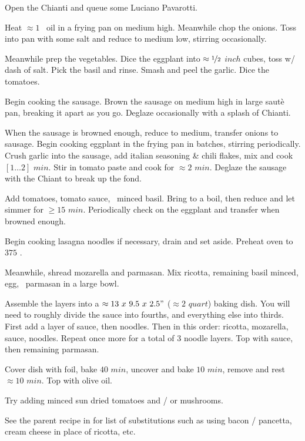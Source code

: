 
\begin{preparation}
\item Open the Chianti and queue some Luciano Pavarotti.
\item Heat $\approx 1$ \Tablespoon~oil in a frying pan on medium high.
	Meanwhile chop the onions.
	Toss into pan with some salt and reduce to medium low, stirring occasionally.
\item Meanwhile prep the vegetables.
	Dice the eggplant into $\approx\nicefrac{1}{2}$ $inch$ cubes, toss w/ dash of salt.
	Pick the basil and rinse.
	Smash and peel the garlic.
	Dice the tomatoes.
\item Begin cooking the sausage.
	Brown the sausage on medium high in large saut\`{e} pan, breaking it apart as you go.
	Deglaze occasionally with a splash of Chianti.
\item When the sausage is browned enough, reduce to medium, transfer onions to sausage.
	Begin cooking eggplant in the frying pan in batches, stirring periodically.
	Crush garlic into the sausage, add italian seasoning \& chili flakes, mix and cook $[1 \dots 2]$ $min$.
	Stir in tomato paste and cook for $\approx 2$ $min$.
	Deglaze the sausage with the Chiant to break up the fond.
\item Add tomatoes, tomato sauce, \onehalf~minced basil.
	Bring to a boil, then reduce and let simmer for $\geq 15$ $min$.
	Periodically check on the eggplant and transfer when browned enough.
\item Begin cooking lasagna noodles if necessary, drain and set aside.
	Preheat oven to $375$ \Fahrenheit.
\item Meanwhile, shread mozarella and parmasan.
	Mix ricotta, remaining basil minced, egg, \onehalf~parmasan in a large bowl.
\item Assemble the layers into a $\approx 13~x~9.5~x~2.5"$ ($\approx 2$ $quart$) baking dish.
	You will need to roughly divide the sauce into fourths, and everything else into thirds.
	First add a layer of sauce, then noodles.
	Then in this order: ricotta, mozarella, sauce, noodles.
	Repeat once more for a total of 3 noodle layers.
	Top with sauce, then remaining parmasan.
\item Cover dish with foil, bake $40$ $min$, uncover and bake $10$ $min$, remove and rest $\approx 10$ $min$.
	Top with olive oil.
\end{preparation}

\begin{variation}
	\item Try adding minced sun dried tomatoes and / or mushrooms.
	\item See the parent recipe in  \cite{newCookBook2014} for list of substitutions such as using bacon / pancetta, cream cheese in place of ricotta, etc.
\end{variation}

\recipeend
